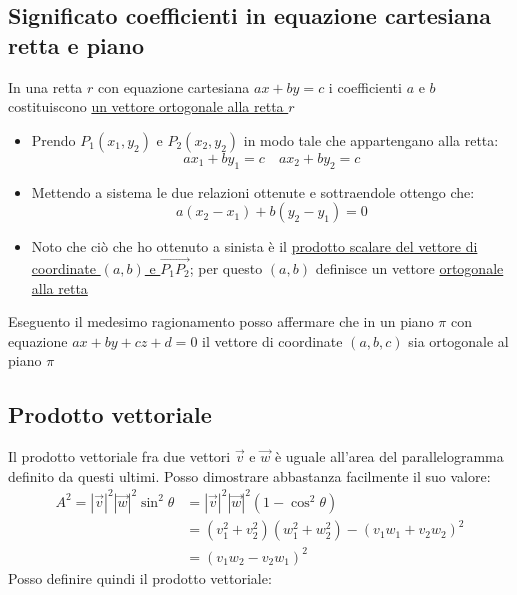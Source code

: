 \documentclass[12pt,a4paper,oneside]{article}
\begin{document}
\subsection{Significato coefficienti in equazione cartesiana retta e piano}
In una retta $r$ con equazione cartesiana $ax + by = c$ i coefficienti $a $ e $b$ costituiscono \underline{un vettore ortogonale alla retta $r$}
\begin{itemize}
	\item Prendo $P_1 \left( x_1,y_2 \right) $ e $P_2 \left( x_2,y_2 \right) $ in modo tale che appartengano alla retta:
	      \[
		      ax_1 + by_1 = c \quad ax_2+ by_2= c
	      \]
	\item Mettendo a sistema le due relazioni ottenute e sottraendole ottengo che:
	      \[
		      a\left( x_2-x_1 \right) + b\left( y_2-y_1 \right)  = 0
	      \]
	\item Noto che ciò che ho ottenuto a sinista è il \underline{prodotto scalare del vettore di coordinate  $\left( a,b \right) $ e $\vec{P_1P_2}$}; per questo $\left( a,b \right) $ definisce un vettore \underline{ortogonale alla retta}
\end{itemize}
Eseguento il medesimo ragionamento posso affermare che in un piano $\pi$ con equazione $ax + by + cz +d =0$ il vettore di coordinate $\left( a,b,c \right) $ sia ortogonale al piano $\pi$

\subsection{Prodotto vettoriale}
Il prodotto vettoriale fra due vettori $\vec{v}$ e $\vec{w}$ è uguale all'area del parallelogramma definito da questi ultimi. Posso dimostrare abbastanza facilmente il suo valore:
\begin{align*}
	A^2= \left|\vec{v}\right|^2\left|\vec{w}\right|^2 \sin ^2\theta & = \left|\vec{v}\right|^2\left|\vec{w}\right|^2 \left( 1- \cos^2 \theta   \right)                \\
	                                                                & = \left( v_1^2 + v_2^2 \right) \left( w_1^2 + w_2^2 \right) - \left( v_1w_1 + v_2w_2 \right) ^2 \\
	                                                                & = \left( v_{1}w_2- v_{2}w_1 \right) ^2
\end{align*}
Posso definire quindi il prodotto vettoriale:
\end{document}
